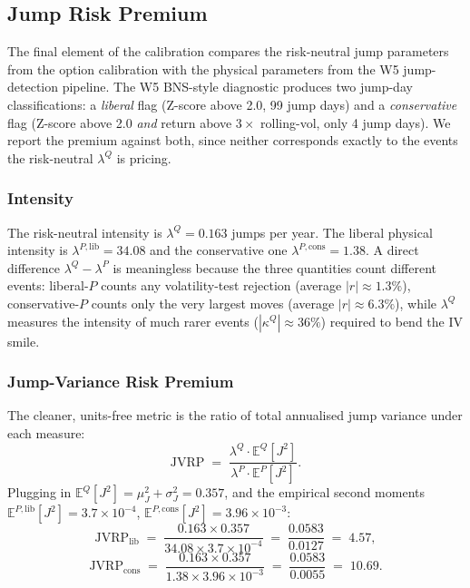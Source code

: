 

\subsection*{Jump Risk Premium}

The final element of the calibration compares the risk-neutral jump
parameters from the option calibration with the physical parameters
from the W5 jump-detection pipeline. The W5 BNS-style diagnostic
produces two jump-day classifications: a \emph{liberal} flag (Z-score
above 2.0, 99 jump days) and a \emph{conservative} flag (Z-score above
2.0 \emph{and} return above $3\times$ rolling-vol, only 4 jump days).
We report the premium against both, since neither corresponds exactly
to the events the risk-neutral $\lambda^Q$ is pricing.

\subsubsection*{Intensity}

The risk-neutral intensity is $\lambda^Q = 0.163$ jumps per year. The
liberal physical intensity is $\lambda^{P,\text{lib}} = 34.08$ and the
conservative one $\lambda^{P,\text{cons}} = 1.38$. A direct difference
$\lambda^Q - \lambda^P$ is meaningless because the three quantities
count different events: liberal-$P$ counts any volatility-test
rejection (average $|r| \approx 1.3\%$), conservative-$P$ counts only
the very largest moves (average $|r| \approx 6.3\%$), while
$\lambda^Q$ measures the intensity of much rarer events
($|\kappa^Q| \approx 36\%$) required to bend the IV smile.

\subsubsection*{Jump-Variance Risk Premium}

The cleaner, units-free metric is the ratio of total annualised jump
variance under each measure:
\[
   \text{JVRP} \;=\;
   \frac{\lambda^Q \cdot \mathbb{E}^Q[J^2]}
        {\lambda^P \cdot \mathbb{E}^P[J^2]}.
\]
Plugging in $\mathbb{E}^Q[J^2] = \mu_J^2 + \sigma_J^2 = 0.357$, and the
empirical second moments $\mathbb{E}^{P,\text{lib}}[J^2] =
3.7 \times 10^{-4}$, $\mathbb{E}^{P,\text{cons}}[J^2] = 3.96 \times
10^{-3}$:
\[
   \text{JVRP}_{\text{lib}}  \;=\;
      \frac{0.163 \times 0.357}{34.08 \times 3.7 \times 10^{-4}}
      \;=\; \frac{0.0583}{0.0127} \;=\; 4.57,
\]
\[
   \text{JVRP}_{\text{cons}} \;=\;
      \frac{0.163 \times 0.357}{1.38 \times 3.96 \times 10^{-3}}
      \;=\; \frac{0.0583}{0.0055} \;=\; 10.69.
\]

